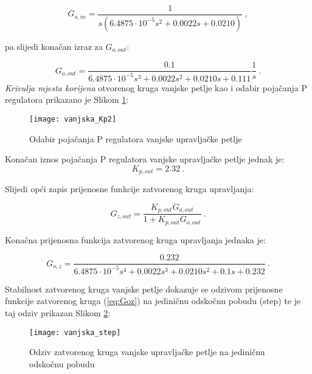 \documentclass[11pt,a4paper]{article}
\begin{document}
\begin{equation}
G_{o,in} = \frac{1}{s(6.4875\cdot10^{-5}s^{2} + 0.0022s  + 0.0210)} \ ,
\label{eq:Goin}
\end{equation}

pa slijedi konačan izraz za $G_{o,out}$:

\begin{equation}
G_{o,out} = \frac{0.1}{6.4875\cdot10^{-5}s^{3} + 0.0022s^{2}  + 0.0210s + 0.111} \frac{1}{s} \ .
\label{eq:Ginz}
\end{equation}
\medskip
\textit{Krivulja mjesta korijena} otvorenog kruga vanjske petlje kao i odabir pojačanja P regulatora prikazano je Slikom \ref{fig:vanjska_Kp}:

\begin{figure}[H]
	\centering
	\texttt{[image: vanjska\_Kp2]}
	\caption{Odabir pojačanja P regulatora vanjske upravljačke petlje}
	\label{fig:vanjska_Kp}
\end{figure}

\newpage
Konačan iznos pojačanja P regulatora vanjske upravljačke petlje jednak je:
 \begin{equation}
 \boxed{
 K_{p,out} = 2.32
 } \ .
 \label{eq:Kp_out}
 \end{equation}
 
Slijedi opći zapis prijenosne funkcije zatvorenog kruga upravljanja:

\begin{equation}
G_{z,out} = \frac{K_{p,out}G_{o,out}}{1 + K_{p,out}G_{o,out}} \ .
\label{eq:Goutz}
\end{equation}
 
 Konačna prijenosna funkcija zatvorenog kruga upravljanja jednaka je:
 
 \begin{equation}
 G_{o,z} = \frac{0.232}{6.4875\cdot10^{-5}s^{4} + 0.0022s^{3}  + 0.0210s^{2} + 0.1s + 0.232} \ .
 \label{eq:Goz}
 \end{equation}

Stabilnost zatvorenog kruga vanjske petlje dokazuje se odzivom prijenosne funkcije zatvorenog kruga (\ref{eq:Goz}) na jediničnu odskočnu pobudu (step) te je taj odziv prikazan Slikom \ref{fig:step2}:

\begin{figure}[H]
	\centering
	\texttt{[image: vanjska\_step]}
	\caption{Odziv zatvorenog kruga vanjske upravljačke petlje na jediničnu odskočnu pobudu}
	\label{fig:step2}
\end{figure}
\end{document}

